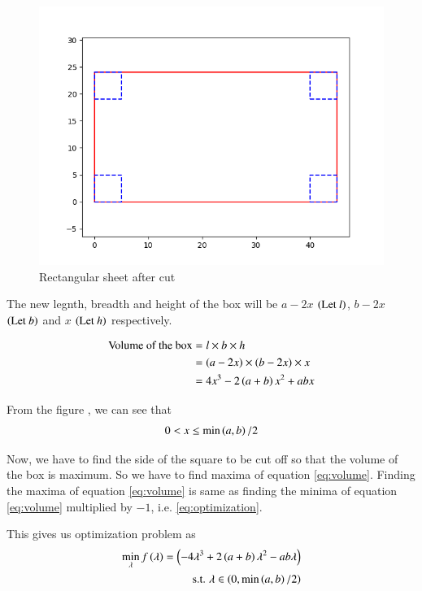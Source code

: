 \documentclass[journal,12pt,twocolumn]{IEEEtran}
\begin{document}
\begin{figure}[!htb]
    \centering
    \includegraphics[width=\columnwidth]{figs/rectangle2.png}
    \caption{Rectangular sheet after cut}
    \label{fig:rectangular sheet cut}
\end{figure}

The new legnth, breadth and height of the box will be $a-2x$ $\left(\text{Let }l\right)$, $b-2x$ $\left(\text{Let }b\right)$ and $x$ $\left(\text{Let }h\right)$ respectively.

\begin{align}
    \text{Volume of the box} &= l \times b \times h \\
    & = (a-2x) \times (b-2x) \times x \\
    \label{eq:volume} & = 4x^3 - 2\left(a+b\right)x^2 + abx
\end{align}

From the figure , we can see that
\begin{align}
    \label{eq:x_range}
    0 < x \leq \min\left(a,b\right)/2
\end{align}

Now, we have to find the side of the square to be cut off so that the volume of the box is maximum. So we have to find maxima of equation \eqref{eq:volume}.
Finding the maxima of equation \eqref{eq:volume} is same as finding the minima of equation \eqref{eq:volume} multiplied by $-1$, i.e. \eqref{eq:optimization}.


This gives us optimization problem as
\begin{align}
    \label{eq:optimization}
    \min_{\lambda} f\left(\lambda\right) = \left(-4\lambda^3 + 2\left(a+b\right)\lambda^2 - ab\lambda\right)\\
    \text{s.t. } \lambda \in \left(0, \min\left(a,b\right)/2\right)
\end{align}
\end{document}
